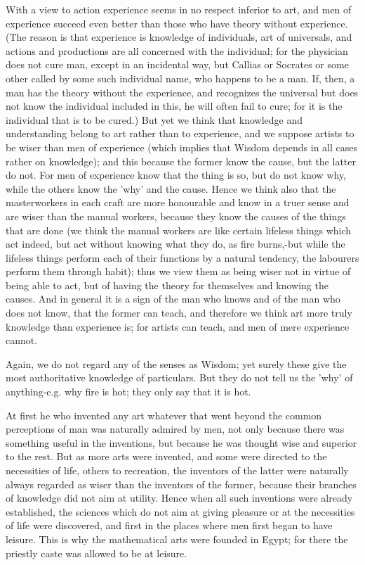 \documentclass[oneside, 17pt, dvipsnames]{extbook}
\begin{document}
With a view to action experience seems in no respect inferior to art, and men of experience succeed even better than those who have theory without experience. (The reason is that experience is knowledge of individuals, art of universals, and actions and productions are all concerned with the individual; for the physician does not cure man, except in an incidental way, but Callias or Socrates or some other called by some such individual name, who happens to be a man. If, then, a man has the theory without the experience, and recognizes the universal but does not know the individual included in this, he will often fail to cure; for it is the individual that is to be cured.) But yet we think that knowledge and understanding belong to art rather than to experience, and we suppose artists to be wiser than men of experience (which implies that Wisdom depends in all cases rather on knowledge); and this because the former know the cause, but the latter do not. For men of experience know that the thing is so, but do not know why, while the others know the 'why' and the cause. Hence we think also that the masterworkers in each craft are more honourable and know in a truer sense and are wiser than the manual workers, because they know the causes of the things that are done (we think the manual workers are like certain lifeless things which act indeed, but act without knowing what they do, as fire burns,-but while the lifeless things perform each of their functions by a natural tendency, the labourers perform them through habit); thus we view them as being wiser not in virtue of being able to act, but of having the theory for themselves and knowing the causes. And in general it is a sign of the man who knows and of the man who does not know, that the former can teach, and therefore we think art more truly knowledge than experience is; for artists can teach, and men of mere experience cannot.

Again, we do not regard any of the senses as Wisdom; yet surely these give the most authoritative knowledge of particulars. But they do not tell us the 'why' of anything-e.g. why fire is hot; they only say that it is hot.

At first he who invented any art whatever that went beyond the common perceptions of man was naturally admired by men, not only because there was something useful in the inventions, but because he was thought wise and superior to the rest. But as more arts were invented, and some were directed to the necessities of life, others to recreation, the inventors of the latter were naturally always regarded as wiser than the inventors of the former, because their branches of knowledge did not aim at utility. Hence when all such inventions were already established, the sciences which do not aim at giving pleasure or at the necessities of life were discovered, and first in the places where men first began to have leisure. This is why the mathematical arts were founded in Egypt; for there the priestly caste was allowed to be at leisure.
\end{document}

